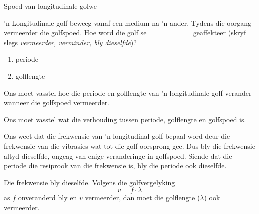 \begin{wex}
{Spoed van longitudinale golwe}{ 'n Longitudinale golf beweeg vanaf een medium na  'n ander. Tydens die oorgang vermeerder die golfspoed. Hoe word die golf se ________ geaffekteer (skryf slegs \emph{vermeerder, verminder, bly dieselfde})?
\begin{enumerate}[noitemsep, label=\textbf{\arabic*}. ]\item periode
\item golflengte
\end{enumerate}
}{
Ons moet vasstel hoe die periode en golflengte van  'n longitudinale golf verander wanneer die golfspoed vermeerder.

Ons moet vasstel wat die verhouding tussen periode, golflengte en golfspoed is.

Ons weet dat die frekwensie van  'n longitudinal golf bepaal word deur die frekwensie van die vibrasies wat tot die golf oorsprong gee. Dus bly die frekwensie altyd dieselfde, ongeag van enige veranderinge in golfspoed. Siende dat die periode die resiprook van die frekwensie is, bly die periode ook dieselfde.

Die frekwensie bly dieselfde. Volgens die golfvergelyking
\begin{equation*}
v = f\cdot\lambda
\end{equation*}
as $f$ onveranderd bly en $v$ vermeerder, dan moet die golflengte ($\lambda$) ook vermeerder.
}
\end{wex}

    \noindent
  \label{m38782**end}
                   \label{m38783*cid8}


